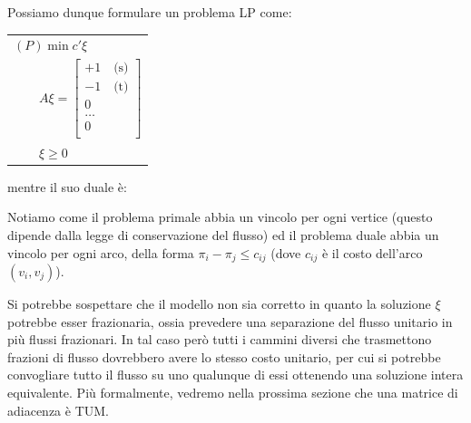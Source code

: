 \documentclass[11pt]{book}
\begin{document}
Possiamo dunque formulare un problema LP come:

\vspace{11pt}
\begin{center}
\begin{tabular}{l}
$(P) \min c'\xi$\\
$\qquad A\xi = \begin{bmatrix} 
+1 \quad \text{(s)}\\
-1 \quad \text{(t)}\\
0\\
\dots\\
0\\
\end{bmatrix}$\\
$\qquad\xi \geq 0$
\end{tabular}
\end{center}
\vspace{11pt}

mentre il suo duale \`e:

\vspace{11pt}
\begin{center}
\end{center}
\vspace{11pt}

Notiamo come il problema primale abbia un vincolo per ogni vertice
(questo dipende dalla legge di conservazione del flusso) ed il
problema duale abbia un vincolo per ogni arco, della forma $\pi_i -
\pi_j \leq c_{ij}$ (dove $c_{ij}$ \`e il costo dell'arco $(v_i,v_j)$).

Si potrebbe sospettare che il modello non sia corretto in quanto la
soluzione $\xi$ potrebbe esser frazionaria, ossia prevedere una
separazione del flusso unitario in pi\`u flussi frazionari. In tal
caso per\`o tutti i cammini diversi che trasmettono frazioni di flusso
dovrebbero avere lo stesso costo unitario, per cui si potrebbe
convogliare tutto il flusso su uno qualunque di essi ottenendo una
soluzione intera equivalente. Pi\`u formalmente, vedremo nella
prossima sezione che una matrice di adiacenza \`e TUM.
\end{document}
